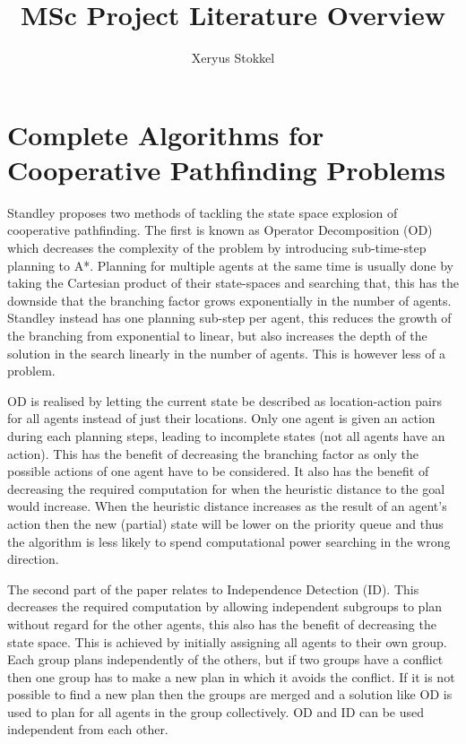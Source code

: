 \documentclass[a4paper]{article}
\title{MSc Project Literature Overview}
\author{Xeryus Stokkel}
\date{}
\begin{document}
\maketitle

\section{Complete Algorithms for Cooperative Pathfinding 
Problems\cite{standley2010}}
Standley proposes two methods of tackling the state space explosion of 
cooperative pathfinding. The first is known as Operator Decomposition (OD) 
which decreases the complexity of the problem by introducing sub-time-step 
planning to A*. Planning for multiple agents at the same time is usually done 
by taking the Cartesian product of their state-spaces and searching that, this 
has the downside that the branching factor grows exponentially in the number of 
agents. Standley instead has one planning sub-step per agent, this reduces the 
growth of the branching from exponential to linear, but also increases the 
depth of the solution in the search linearly in the number of agents. This is 
however less of a problem.

OD is realised by letting the current state be described as location-action 
pairs for all agents instead of just their locations. Only one agent is given 
an action during each planning steps, leading to incomplete states (not all 
agents have an action). This has the benefit of decreasing the branching factor 
as only the possible actions of one agent have to be considered. It also has 
the benefit of decreasing the required computation for when the heuristic 
distance to the goal would increase. When the heuristic distance increases as 
the result of an agent's action then the new (partial) state will be lower on 
the priority queue and thus the algorithm is less likely to spend computational 
power searching in the wrong direction.

The second part of the paper relates to Independence Detection (ID). This 
decreases the required computation by allowing independent subgroups to plan 
without regard for the other agents, this also has the benefit of decreasing 
the state space. This is achieved by initially assigning all agents to their 
own group. Each group plans independently of the others, but if two groups have 
a conflict then one group has to make a new plan in which it avoids the 
conflict. If it is not possible to find a new plan then the groups are merged 
and a solution like OD is used to plan for all agents in the group 
collectively. OD and ID can be used independent from each other.
\end{document}
